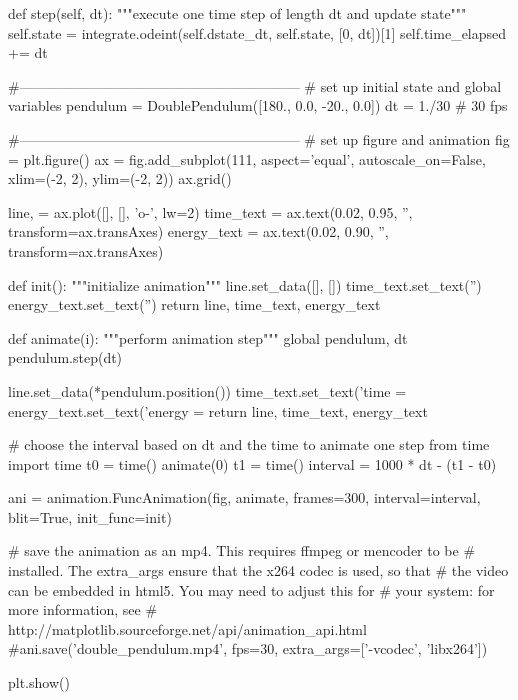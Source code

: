 \documentclass[12pt]{article}
\begin{document}
\begin{boxedverbatim}
def step(self, dt):
        """execute one time step of length dt and update state"""
        self.state = integrate.odeint(self.dstate_dt, self.state, [0, dt])[1]
        self.time_elapsed += dt

#------------------------------------------------------------
# set up initial state and global variables
pendulum = DoublePendulum([180., 0.0, -20., 0.0])
dt = 1./30 # 30 fps

#------------------------------------------------------------
# set up figure and animation
fig = plt.figure()
ax = fig.add_subplot(111, aspect='equal', autoscale_on=False,
                     xlim=(-2, 2), ylim=(-2, 2))
ax.grid()

line, = ax.plot([], [], 'o-', lw=2)
time_text = ax.text(0.02, 0.95, '', transform=ax.transAxes)
energy_text = ax.text(0.02, 0.90, '', transform=ax.transAxes)

def init():
    """initialize animation"""
    line.set_data([], [])
    time_text.set_text('')
    energy_text.set_text('')
    return line, time_text, energy_text

def animate(i):
    """perform animation step"""
    global pendulum, dt
    pendulum.step(dt)
    
    line.set_data(*pendulum.position())
    time_text.set_text('time = %
    energy_text.set_text('energy = %
    return line, time_text, energy_text

# choose the interval based on dt and the time to animate one step
from time import time
t0 = time()
animate(0)
t1 = time()
interval = 1000 * dt - (t1 - t0)
\end{boxedverbatim}

\pagebreak

\begin{boxedverbatim}
ani = animation.FuncAnimation(fig, animate, frames=300,
                              interval=interval, blit=True, init_func=init)

# save the animation as an mp4.  This requires ffmpeg or mencoder to be
# installed.  The extra_args ensure that the x264 codec is used, so that
# the video can be embedded in html5.  You may need to adjust this for
# your system: for more information, see
# http://matplotlib.sourceforge.net/api/animation_api.html
#ani.save('double_pendulum.mp4', fps=30, extra_args=['-vcodec', 'libx264'])

plt.show()
\end{boxedverbatim}
\pagebreak
\end{document}
